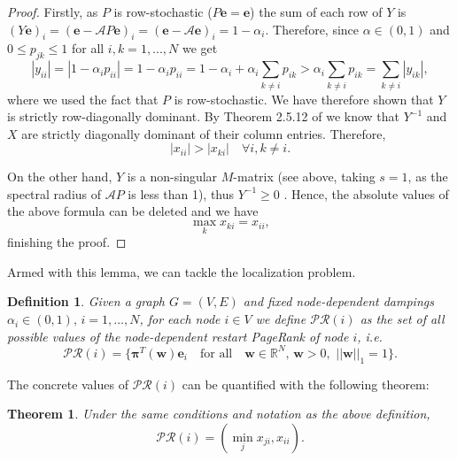 \documentclass[sn-mathphys-ay]{sn-jnl}%
\newcommand{\bw}{\bm{w}}
\newcommand{\be}{\mathbf{e}}
\newcommand{\cA}{\mathcal{A}}
\theoremstyle{thmstyleone}%
\newtheorem{theorem}{Theorem}%
\theoremstyle{thmstyletwo}%
\theoremstyle{thmstylethree}%
\newtheorem{definition}{Definition}%
\begin{document}
\begin{proof}
	Firstly, as $P$ is row-stochastic ($P\be=\be$) the sum of each row of $Y$ is $(Y\be)_i=(\be-\cA P\be)_i=(\be-\cA \be)_i=1-\alpha_i$. Therefore, since $\alpha\in(0,1)$ and $0\leq p_{jk} \leq 1$ for all $i,k=1,...,N$ we get
	\begin{equation}
		|y_{ii}| = |1-\alpha_{i} p_{ii}| = 1 - \alpha_i p_{ii} = 1 - \alpha_i + \alpha_i \sum_{k\neq i} p_{ik} > \alpha_i \sum_{k\neq i} p_{ik} = \sum_{k\neq i} |y_{ik}|,
	\end{equation}
	where we used the fact that $P$ is row-stochastic. We have therefore shown that $Y$ is strictly row-diagonally dominant. By Theorem 2.5.12 of \cite{horn1991topics} we know that $Y^{-1}$ and $X$ are strictly diagonally dominant of their column entries. Therefore,
	\begin{equation}
		|x_{ii}| > |x_{ki}| \quad \forall i, k \neq i.
	\end{equation} 
	
	On the other hand, $Y$ is a non-singular $M$-matrix (see above, taking $s=1$, as the spectral radius of $\cA P$ is less than 1), thus $Y^{-1}\geq 0$ \cite{meyer2001matrix}. Hence, the absolute values of the above formula can be deleted and we have
	\begin{equation}
		\max_{k} x_{ki} = x_{ii},
	\end{equation}
	finishing the proof.
\end{proof}


Armed with this lemma, we can tackle the localization problem. 
\begin{definition}
	Given a graph $G=(V,E)$ and fixed node-dependent dampings $\alpha_i\in (0, 1),\, i= 1,...,N$, for each node $i \in V$ we define $\mathcal{P R}(i)$ as the set of all possible values of the node-dependent restart PageRank of node $i$, i.e.
	\begin{equation}
		\mathcal{P R}(i) = \{\bm{\pi}^T(\bw) \be_i\quad \text{for all}\quad \bw\in\mathbb{R}^N, \, \bw>0,\, \, ||\bw||_1=1\}.
	\end{equation}
\end{definition}


The concrete values of $\mathcal{PR}(i)$ can be quantified with the following theorem:

\begin{theorem}
	Under the same conditions and notation as the above definition,
	\begin{equation}
		\mathcal{P R}(i) = (\min_j x_{ji}, x_{ii}).
	\end{equation}
\end{theorem}
\end{document}
